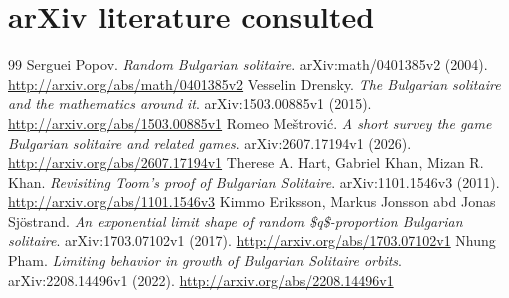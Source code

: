\documentclass[11pt,a4paper]{article}
\begin{document}
\section{arXiv literature consulted}
\begin{thebibliography}{99}
 Serguei Popov. \emph{Random Bulgarian solitaire}. arXiv:math/0401385v2 (2004). \url{http://arxiv.org/abs/math/0401385v2}
 Vesselin Drensky. \emph{The Bulgarian solitaire and the mathematics around it}. arXiv:1503.00885v1 (2015). \url{http://arxiv.org/abs/1503.00885v1}
 Romeo Meštrović. \emph{A short survey the game Bulgarian solitaire and related games}. arXiv:2607.17194v1 (2026). \url{http://arxiv.org/abs/2607.17194v1}
 Therese A. Hart, Gabriel Khan, Mizan R. Khan. \emph{Revisiting Toom's proof of Bulgarian Solitaire}. arXiv:1101.1546v3 (2011). \url{http://arxiv.org/abs/1101.1546v3}
 Kimmo Eriksson, Markus Jonsson abd Jonas Sjöstrand. \emph{An exponential limit shape of random \$q\$-proportion Bulgarian solitaire}. arXiv:1703.07102v1 (2017). \url{http://arxiv.org/abs/1703.07102v1}
 Nhung Pham. \emph{Limiting behavior in growth of Bulgarian Solitaire orbits}. arXiv:2208.14496v1 (2022). \url{http://arxiv.org/abs/2208.14496v1}
\end{thebibliography}
\end{document}
